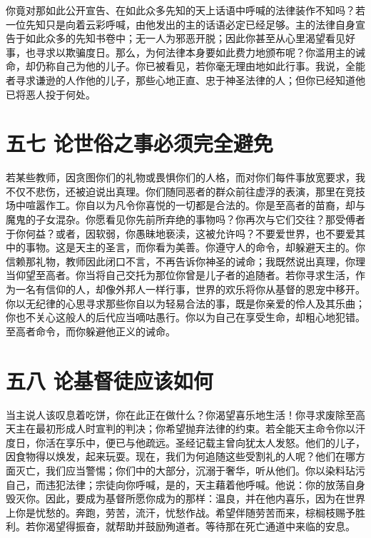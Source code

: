 你竟对那如此公开宣告、在如此众多先知的天上话语中呼喊的法律装作不知吗？若一位先知只是向着云彩呼喊，由他发出的主的话语必定已经足够。主的法律自身宣告于如此众多的先知书卷中；无一人为邪恶开脱；因此你甚至从心里渴望看见好事，也寻求以欺骗度日。那么，为何法律本身要如此费力地颁布呢？你滥用主的诫命，却仍称自己为他的儿子。你已被看见，若你毫无理由地如此行事。我说，全能者寻求谦逊的人作他的儿子，那些心地正直、忠于神圣法律的人；但你已经知道他已将恶人投于何处。\par


\section{五七 论世俗之事必须完全避免}

若某些教师，因贪图你们的礼物或畏惧你们的人格，而对你们每件事放宽要求，我不仅不悲伤，还被迫说出真理。你们随同恶者的群众前往虚浮的表演，那里在竞技场中喧嚣作工。你自以为凡令你喜悦的一切都是合法的。你是至高者的苗裔，却与魔鬼的子女混杂。你愿看见你先前所弃绝的事物吗？你再次与它们交往？那受傅者于你何益？或者，因软弱，你愚昧地亵渎，这被允许吗？不要爱世界，也不要爱其中的事物。这是天主的圣言，而你看为美善。你遵守人的命令，却躲避天主的。你信赖那礼物，教师因此闭口不言，不再告诉你神圣的诫命；我既然说出真理，你理当仰望至高者。你当将自己交托为那位你曾是儿子者的追随者。若你寻求生活，作为一名有信仰的人，却像外邦人一样行事，世界的欢乐将你从基督的恩宠中移开。你以无纪律的心思寻求那些你自以为轻易合法的事，既是你亲爱的伶人及其乐曲；你也不关心这般人的后代应当嘀咕愚行。你以为自己在享受生命，却粗心地犯错。至高者命令，而你躲避他正义的诫命。\par


\section{五八 论基督徒应该如何}

当主说人该叹息着吃饼，你在此正在做什么？你渴望喜乐地生活！你寻求废除至高天主在最初形成人时宣判的判决；你希望抛弃法律的约束。若全能天主命令你以汗度日，你活在享乐中，便已与他疏远。圣经记载主曾向犹太人发怒。他们的儿子，因食物得以焕发，起来玩耍。现在，我们为何追随这些受割礼的人呢？他们在哪方面灭亡，我们应当警惕；你们中的大部分，沉溺于奢华，听从他们。你以染料玷污自己，而违犯法律；宗徒向你呼喊，是的，天主藉着他呼喊。他说：你的放荡自身毁灭你。因此，要成为基督所愿你成为的那样：温良，并在他内喜乐，因为在世界上你是忧愁的。奔跑，劳苦，流汗，忧愁作战。希望伴随劳苦而来，棕榈枝赐予胜利。若你渴望得振奋，就帮助并鼓励殉道者。等待那在死亡通道中来临的安息。\par

